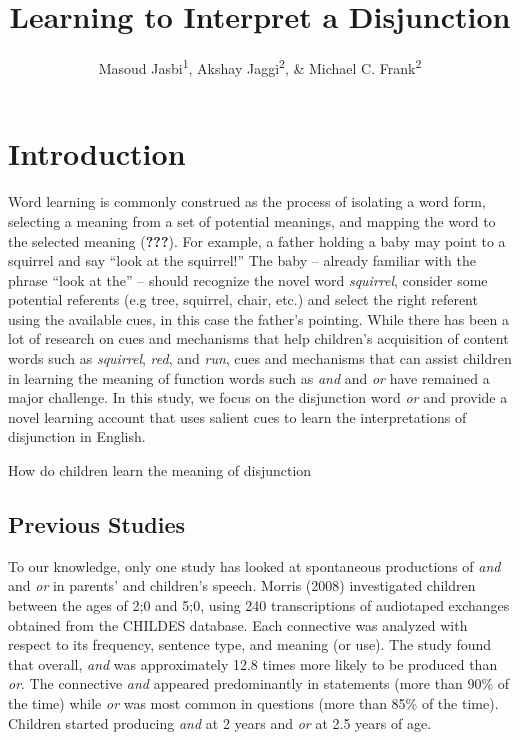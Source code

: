 \documentclass[,man,floatsintext]{apa6}
\title{Learning to Interpret a Disjunction}
\author{Masoud Jasbi\textsuperscript{1}, Akshay Jaggi\textsuperscript{2}, \& Michael C. Frank\textsuperscript{2}}
\date{}
\affiliation{
\vspace{0.5cm}
\textsuperscript{1} Harvard University\\\textsuperscript{2} Stanford University}
\begin{document}
\maketitle

\hypertarget{introduction}{%
\section{Introduction}\label{introduction}}

Word learning is commonly construed as the process of isolating a word form, selecting a meaning from a set of potential meanings, and mapping the word to the selected meaning ({\textbf{???}}). For example, a father holding a baby may point to a squirrel and say \enquote{look at the squirrel!} The baby -- already familiar with the phrase \enquote{look at the} -- should recognize the novel word \emph{squirrel}, consider some potential referents (e.g tree, squirrel, chair, etc.) and select the right referent using the available cues, in this case the father's pointing. While there has been a lot of research on cues and mechanisms that help children's acquisition of content words such as \emph{squirrel}, \emph{red}, and \emph{run}, cues and mechanisms that can assist children in learning the meaning of function words such as \emph{and} and \emph{or} have remained a major challenge. In this study, we focus on the disjunction word \emph{or} and provide a novel learning account that uses salient cues to learn the interpretations of disjunction in English.

How do children learn the meaning of disjunction

\hypertarget{previous-studies}{%
\subsection{Previous Studies}\label{previous-studies}}

To our knowledge, only one study has looked at spontaneous productions of \emph{and} and \emph{or} in parents' and children's speech. Morris (2008) investigated children between the ages of 2;0 and 5;0, using 240 transcriptions of audiotaped exchanges obtained from the CHILDES database. Each connective was analyzed with respect to its frequency, sentence type, and meaning (or use). The study found that overall, \emph{and} was approximately 12.8 times more likely to be produced than \emph{or}. The connective \emph{and} appeared predominantly in statements (more than 90\% of the time) while \emph{or} was most common in questions (more than 85\% of the time). Children started producing \emph{and} at 2 years and \emph{or} at 2.5 years of age.
\end{document}
